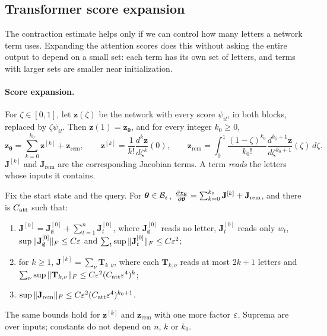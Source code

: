 \subsection{Transformer score expansion}
\label{app:model-spectrum}

The contraction estimate helps only if we can control how many letters a network term uses. Expanding the attention scores does
this without asking the entire output to depend on a small set: each term has its own set of letters, and terms with larger sets
are smaller near initialization.

\paragraph{Score expansion.} For $\zeta\in[0,1]$, let $\bm z(\zeta)$ be the network with every score $\psi_{il}$, in both blocks, replaced by
$\zeta\psi_{il}$. Then $\bm z(1)=\bm z_{\bm\theta}$, and for every integer $k_0\ge0$,
\begin{equation}
 \bm z_{\bm\theta}=\sum_{k=0}^{k_0}\bm z^{[k]}+\bm z_{\mathrm{rem}},\qquad
 \bm z^{[k]}=\frac{1}{k!}\frac{d^k\bm z}{d\zeta^k}(0),\qquad
 \bm z_{\mathrm{rem}}=\int_0^1\frac{(1-\zeta)^{k_0}}{k_0!}\frac{d^{k_0+1}\bm z}{d\zeta^{k_0+1}}(\zeta)\,d\zeta .
 \label{eq:score-split}
\end{equation}
$\mathbf J^{[k]}$ and $\mathbf J_{\mathrm{rem}}$ are the corresponding Jacobian terms. A term \emph{reads} the letters whose inputs it contains.

\begin{proposition}
\label{prop:score-degree}
Fix the start state and the query. For $\bm\theta\in\mathcal B_{\varepsilon}$, $\Jz=\sum_{k=0}^{k_0}\mathbf J^{[k]}+\mathbf J_{\mathrm{rem}}$, and there is $C_{\mathrm{att}}$ such that:
\begin{enumerate}[label=(\roman*),leftmargin=*,itemsep=2pt,topsep=2pt]
\item $\mathbf J^{[0]}=\mathbf J^{[0]}_\emptyset+\sum_{t=1}^n\mathbf J^{[0]}_t$, where $\mathbf J^{[0]}_\emptyset$ reads no letter, $\mathbf J^{[0]}_t$ reads only $w_t$, $\sup\|\mathbf J^{[0]}_\emptyset\|_F\le C\varepsilon$ and
$\sum_t\sup\|\mathbf J^{[0]}_t\|_F\le C\varepsilon^2$;
\item for $k\ge1$, $\mathbf J^{[k]}=\sum_\nu\mathbf T_{k,\nu}$, where each $\mathbf T_{k,\nu}$ reads at most $2k+1$ letters and $\sum_\nu\sup\|\mathbf T_{k,\nu}\|_F\le C\varepsilon^2(C_{\mathrm{att}}\varepsilon^4)^k$;
\item $\sup\|\mathbf J_{\mathrm{rem}}\|_F\le C\varepsilon^2(C_{\mathrm{att}}\varepsilon^4)^{k_0+1}$.
\end{enumerate}
The same bounds hold for $\bm z^{[k]}$ and $\bm z_{\mathrm{rem}}$ with one more factor $\varepsilon$. Suprema are over inputs; constants do not depend on
$n$, $k$ or $k_0$.
\end{proposition}

